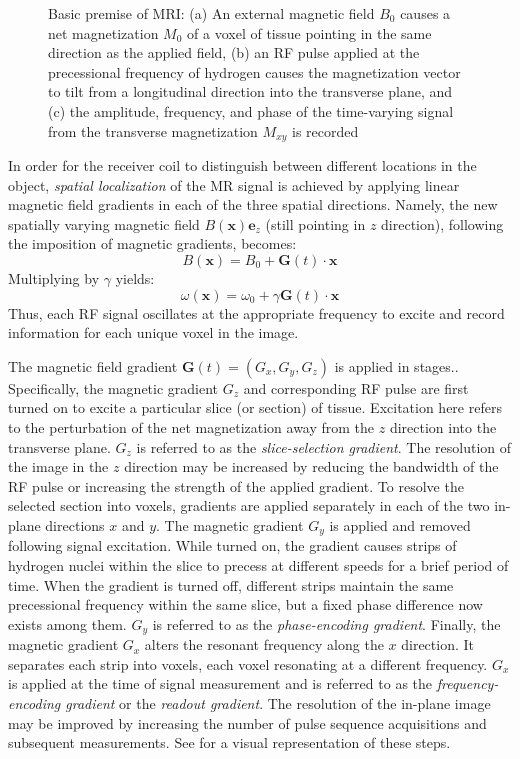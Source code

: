 \begin{figure}[ht]
{\label{fig:mr23}}
%
\caption{Basic premise of MRI: (a) An external magnetic field $B_0$ causes a net magnetization $M_0$ of a voxel of tissue pointing in the same direction as the applied field, (b) an RF pulse applied at the precessional frequency of hydrogen causes the magnetization vector to tilt from a longitudinal direction into the transverse plane, and (c) the amplitude, frequency, and phase of the time-varying signal from the transverse magnetization $M_{xy}$ is recorded~\cite{hendrick_1994}}
\label{fig:mr2}
\end{figure}

In order for the receiver coil to distinguish between different locations in the object, \textit{spatial localization} of the MR signal is achieved by applying linear magnetic field gradients in each of the three spatial directions. Namely, the new spatially varying magnetic field $B(\bm{x})\bm{e}_z$ (still pointing in $z$ direction), following the imposition of magnetic gradients, becomes:
\begin{equation}
B(\bm{x}) = B_0 + \bm{G}(t) \cdot \bm{x}
\label{eqn:gradient}
\end{equation}
Multiplying  by $\gamma$ yields:
\begin{equation}
\omega(\bm{x}) = \omega_0 + \gamma\bm{G}(t) \cdot \bm{x}
\label{eqn:freq}
\end{equation}
Thus, each RF signal oscillates at the appropriate frequency to excite and record information for each unique voxel in the image.

The magnetic field gradient $\bm{G}(t) = (G_x, G_y, G_z)$ is applied in stages.. Specifically, the magnetic gradient $G_z$ and corresponding RF pulse are first turned on to excite a particular slice (or section) of tissue. Excitation here refers to the perturbation of the net magnetization away from the $z$ direction into the transverse plane. $G_z$ is referred to as the \textit{slice-selection gradient}. The resolution of the image in the $z$ direction may be increased by reducing the bandwidth of the RF pulse or increasing the strength of the applied gradient. To resolve the selected section into voxels, gradients are applied separately in each of the two in-plane directions $x$ and $y$. The magnetic gradient $G_y$ is applied and removed following signal excitation. While turned on, the gradient causes strips of hydrogen nuclei within the slice to precess at different speeds for a brief period of time. When the gradient is turned off, different strips maintain the same precessional frequency within the same slice, but a fixed phase difference now exists among them. $G_y$ is referred to as the \textit{phase-encoding gradient}. Finally, the magnetic gradient $G_x$ alters the resonant frequency along the $x$ direction. It separates each strip into voxels, each voxel resonating at a different frequency. $G_x$ is applied at the time of signal measurement and is referred to as the  \textit{frequency-encoding gradient} or the \textit{readout gradient}. The resolution of the in-plane image may be improved by increasing the number of pulse sequence acquisitions and subsequent measurements. See  for a visual representation of these steps.

